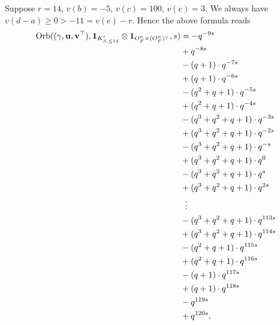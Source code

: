 \begin{example}
  Suppose $r = 14$, $v(b) = -5$, $v(c) = 100$, $v(e) = 3$.
  We always have $v(d-a) \ge 0 > -11 = v(e) - r$.
  Hence the above formula reads
  \begin{align*}
    \Orb(\guv, \mathbf{1}_{K'_{S, \le 14}} \otimes \oneV, s)
    &= -q^{-9s} \\
    &+ q^{-8s} \\
    &- (q+1) \cdot q^{-7s} \\
    &+ (q+1) \cdot q^{-6s} \\
    &- (q^2+q+1) \cdot q^{-5s} \\
    &+ (q^2+q+1) \cdot q^{-4s} \\
    &- (q^3+q^2+q+1) \cdot q^{-3s} \\
    &+ (q^3+q^2+q+1) \cdot q^{-2s} \\
    &- (q^3+q^2+q+1) \cdot q^{-s} \\
    &+ (q^3+q^2+q+1) \cdot q^{0} \\
    &- (q^3+q^2+q+1) \cdot q^{s} \\
    &+ (q^3+q^2+q+1) \cdot q^{2s} \\
    &\vdotswithin= \\
    &- (q^3+q^2+q+1) \cdot q^{113s} \\
    &+ (q^3+q^2+q+1) \cdot q^{114s} \\
    &- (q^2+q+1) \cdot q^{115s} \\
    &+ (q^2+q+1) \cdot q^{116s} \\
    &- (q+1) \cdot q^{117s} \\
    &+ (q+1) \cdot q^{118s} \\
    &- q^{119s} \\
    &+ q^{120s}.
  \end{align*}
\end{example}

